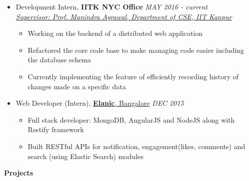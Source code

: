 \documentclass[letterpaper,11pt]{article}
\begin{document}
{\begin{itemize}
    \item Development Intern, \textbf{IITK NYC Office} \hfill \textit{MAY 2016 - current}\\
    \textit{\href{http://www.cse.iitk.ac.in/users/manindra/}{Supervisor: Prof. Manindra Agrawal, Department of CSE, IIT Kanpur}}
        \begin{itemize}
            \item Working on the backend of a distributed web application
            \item Refactored the core code base to make managing code easier including the database schema
            \item Currently implementing the feature of efficiently recording history of changes made on a specific data
        \end{itemize}
    \item Web Developer (Intern), \href{http://elanic.in//}{\textbf{Elanic}, Bangalore} \hfill \textit{DEC 2015}
        \begin{itemize}
            \item Full stack developer: MongoDB, AngularJS and NodeJS along with Restify framework
            \item Built RESTful APIs for notification, engagement(likes, comments) and search (using Elastic Search) modules
        \end{itemize}
\end{itemize}

\Large{\textbf{Projects}}
\small
\vspace{-2pt}

}
\end{document}
